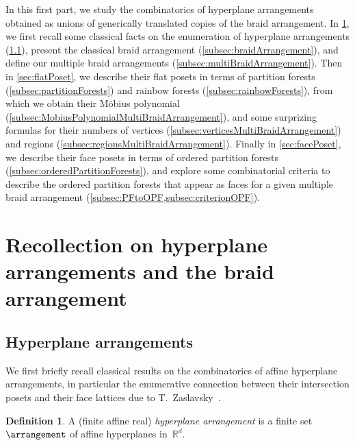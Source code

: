 \documentclass{amsart}
\newcommand{\darkblue}{\color{darkblue}} %
\theoremstyle{definition}
\newtheorem{definition}[theorem]{Definition}
\newcommand{\R}{\mathbb{R}} %
\newcommand{\defn}[1]{\textsl{\darkblue #1}} %
\begin{document}
In this first part, we study the combinatorics of hyperplane arrangements obtained as unions of generically translated copies of the braid arrangement.
In \cref{sec:arrangements}, we first recall some classical facts on the enumeration of hyperplane arrangements (\cref{subsec:arrangements}), present the classical braid arrangement (\cref{subsec:braidArrangement}), and define our multiple braid arrangements (\cref{subsec:multiBraidArrangement}).
Then in \cref{sec:flatPoset}, we describe their flat posets in terms of partition forests (\cref{subsec:partitionForests}) and rainbow forests (\cref{subsec:rainbowForests}), from which we obtain their M\"obius polynomial (\cref{subsec:MobiusPolynomialMultiBraidArrangement}), and some surprizing formulas for their numbers of vertices (\cref{subsec:verticesMultiBraidArrangement}) and regions (\cref{subsec:regionsMultiBraidArrangement}).
Finally in \cref{sec:facePoset}, we describe their face posets in terms of ordered partition forests (\cref{subsec:orderedPartitionForests}), and explore some combinatorial criteria to describe the ordered partition forests that appear as faces for a given multiple braid arrangement (\cref{subsec:PFtoOPF,subsec:criterionOPF}).


\section{Recollection on hyperplane arrangements and the braid arrangement}
\label{sec:arrangements}


\subsection{Hyperplane arrangements}
\label{subsec:arrangements}

We first briefly recall classical results on the combinatorics of affine hyperplane arrangements, in particular the enumerative connection between their intersection posets and their face lattices due to T.~Zaslavsky~\cite{Zaslavsky}.

\begin{definition}
A (finite affine real) \defn{hyperplane arrangement} is a finite set~$\arrangement$ of affine hyperplanes in~$\R^d$.
\end{definition}
\end{document}
